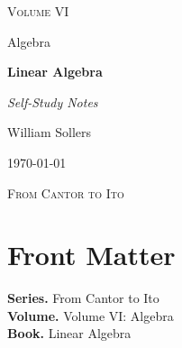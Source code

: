 \documentclass[12pt, a4paper]{report}
\begin{document}
\ExplSyntaxOff
\renewcommand{\familydefault}{\rmdefault}

\begin{titlepage}
\centering
\vspace*{3.5cm}

{\Large\scshape Volume VI\par}
\vspace{0.35cm}
{\large Algebra\par}

\vspace{1.4cm}

{\Huge\bfseries Linear Algebra\par}

\vspace{0.6cm}
{\large\itshape Self-Study Notes\par}

\vfill

{\large William Sollers\par}
\vspace{0.35cm}
{\large \today\par}

\vfill

{\large\scshape From Cantor to Ito\par}
\end{titlepage}

\clearpage
\thispagestyle{plain}
\chapter*{Front Matter}
\noindent\textbf{Series.} From Cantor to Ito\\[0.5em]
\textbf{Volume.} Volume VI: Algebra\\[0.5em]
\textbf{Book.} Linear Algebra

\clearpage
\tableofcontents
\clearpage
{}



\clearpage



\printindex[tech]
\printindex[dep]
\end{document}
